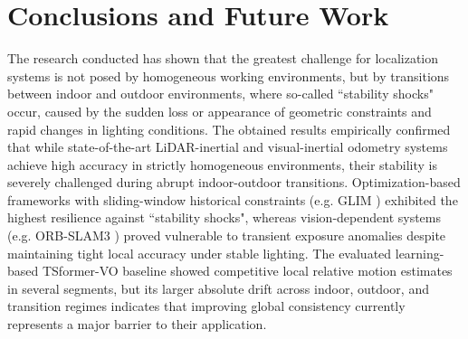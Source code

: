 \documentclass[pdflatex,sn-mathphys-num]{sn-jnl}
\theoremstyle{thmstyleone}%
\theoremstyle{thmstyletwo}%
\theoremstyle{thmstylethree}%
\begin{document}


\section{Conclusions and Future Work}
\label{sec:conclusions}
The research conducted has shown that the greatest challenge for localization systems is not posed by homogeneous working environments, but by transitions between indoor and outdoor environments, where so-called ``stability shocks" occur, caused by the sudden loss or appearance of geometric constraints and rapid changes in lighting conditions. The obtained results empirically confirmed that while state-of-the-art LiDAR-inertial and visual-inertial odometry systems achieve high accuracy in strictly homogeneous environments, their stability is severely challenged during abrupt indoor-outdoor transitions. Optimization-based frameworks with sliding-window historical constraints (e.g. GLIM \cite{Koide_2024}) exhibited the highest resilience against ``stability shocks", whereas vision-dependent systems (e.g. ORB-SLAM3 \cite{ORB-SLAM3}) proved vulnerable to transient exposure anomalies despite maintaining tight local accuracy under stable lighting. The evaluated learning-based TSformer-VO baseline showed competitive local relative motion estimates in several segments, but its larger absolute drift across indoor, outdoor, and transition regimes indicates that improving global consistency currently represents a major barrier to their application.
\end{document}
